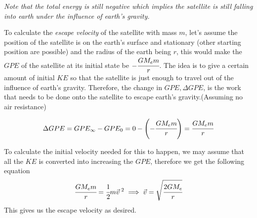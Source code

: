 \documentclass{article}
\begin{document}
\textit{Note that the total energy is still negative which implies the satellite is still falling into earth under the influence of earth's gravity.}
\par 
To calculate the \textit{escape velocity} of the satellite with mass $m$, let's assume the position of the satellite is on the earth's surface and stationary (other starting position are possible) and the radius of the earth being $r$, this would make the $GPE$ of the satellite at its initial state be $-\cfrac{GM_em}{r}$. The idea is to give a certain amount of initial $KE$ so that the satellite is just enough to travel out of the influence of earth's gravity. Therefore, the change in $GPE, \Delta GPE$, is the work that needs to be done onto the satellite to escape earth's gravity.(Assuming no air resistance)

$$\Delta GPE= GPE_{\infty}-GPE_0 =0-\left(-\cfrac{GM_em}{r}\right)=\cfrac{GM_em}{r}$$

To calculate the initial velocity needed for this to happen, we may assume that all the $KE$ is converted into increasing the $GPE$, therefore we get the following equation
$$\cfrac{GM_em}{r}=\cfrac{1}{2}m{\vec{v}} ^{\; 2}\implies \vec{v}=\sqrt{\cfrac{2GM_e}{r}}$$
This gives us the escape velocity as desired.

\begin{flushleft}
\end{flushleft}
 
\begin{figure}[H]
    \centering
\end{figure} 

\end{document}
